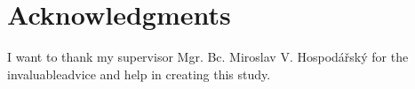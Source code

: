 ﻿\vfill

\section*{Acknowledgments}
I want to thank my supervisor Mgr. Bc. Miroslav V. Hospodářský for the invaluableadvice and help in creating this study.

\vglue 2cm $ $


